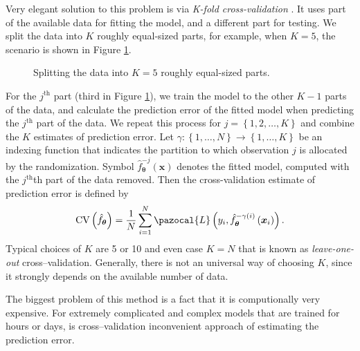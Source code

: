 Very elegant solution to this problem is via \emph{K-fold cross-validation} \cite{statistics}. It
uses part of the available data for fitting the model, and a different
part for testing. We split the data into $K$ roughly equal-sized parts, for
example, when $K = 5$, the scenario is shown in Figure \ref{fig:KFOLD}. 
\begin{figure}[h]
\begin{center}
\end{center}
\caption{Splitting the data into $K=5$ roughly equal-sized parts.}
\label{fig:KFOLD}
\end{figure}
For the $j^{\mathrm{th}}$ part (third in Figure \ref{fig:KFOLD}), we train the model to the other $K-1$ parts
of the data, and calculate the prediction error of the fitted model when
predicting the $j^{\mathrm{th}}$ part of the data. We repeat this process for $j = \left\lbrace 1,2,\dots,K\right\rbrace$ and
combine the $K$ estimates of prediction error. Let $\gamma : \left\lbrace 1,\dots,N\right\rbrace\rightarrow  \left\lbrace 1,\dots,K\right\rbrace$ be an indexing
function that indicates the partition to which observation $j$ is allocated by
the randomization. Symbol $\hat{f}_{\boldsymbol{\theta}}^{-j}\left(\boldsymbol{x}\right)$ denotes the fitted model, computed with
the $j^{\mathrm{th}}$th part of the data removed. Then the cross-validation estimate of
prediction error is defined by
\begin{equation}
\mathrm{CV}\left(\hat{f}_{\boldsymbol{\theta}}\right) = \frac{1}{N}\sum_{i = 1}^{N}\pazocal{L}\left(y_i , \hat{f}_{\boldsymbol{\theta}}^{-\gamma\left(i\right)}\left(\boldsymbol{x}_i\right)\right).
\end{equation}
Typical choices of $K$ are 5 or 10 and even case $K = N$ that is known as \emph{leave-one-out} cross--validation. Generally, there is not an universal way of choosing $K$, since it strongly depends on the available number of data. 

The biggest problem of this method is a fact that it is computionally very expensive. For extremely complicated and complex models that are trained for hours or days, is cross--validation inconvenient approach of estimating the prediction error.

